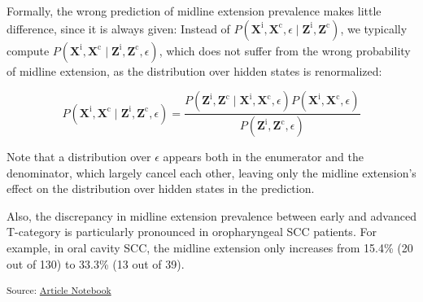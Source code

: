 \documentclass[
  sn-mathphys-num,
]{sn-jnl}
\begin{document}
Formally, the wrong prediction of midline extension prevalence makes
little difference, since it is always given: Instead of
\(P\left( \mathbf{X}^\text{i}, \mathbf{X}^\text{c}, \epsilon \mid \mathbf{Z}^\text{i}, \mathbf{Z}^\text{c} \right)\),
we typically compute
\(P\left( \mathbf{X}^\text{i}, \mathbf{X}^\text{c} \mid \mathbf{Z}^\text{i}, \mathbf{Z}^\text{c}, \epsilon \right)\),
which does not suffer from the wrong probability of midline extension,
as the distribution over hidden states is renormalized:

\[
P \left( \mathbf{X}^\text{i}, \mathbf{X}^\text{c} \mid \mathbf{Z}^\text{i}, \mathbf{Z}^\text{c}, \epsilon \right) = \frac{P \left( \mathbf{Z}^\text{i}, \mathbf{Z}^\text{c} \mid \mathbf{X}^\text{i}, \mathbf{X}^\text{c}, \epsilon \right) P \left( \mathbf{X}^\text{i}, \mathbf{X}^\text{c}, \epsilon \right)}{P \left( \mathbf{Z}^\text{i}, \mathbf{Z}^\text{c}, \epsilon \right)}
\]

Note that a distribution over \(\epsilon\) appears both in the
enumerator and the denominator, which largely cancel each other, leaving
only the midline extension's effect on the distribution over hidden
states in the prediction.

Also, the discrepancy in midline extension prevalence between early and
advanced T-category is particularly pronounced in oropharyngeal SCC
patients. For example, in oral cavity SCC, the midline extension only
increases from 15.4\% (20 out of 130) to 33.3\% (13 out of 39).

\textsubscript{Source:
\href{https://rmnldwg.github.io/bilateral-paper/manuscript.qmd.html}{Article
Notebook}}


  
\end{document}
